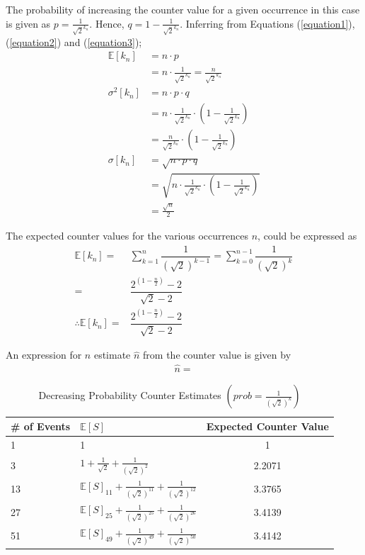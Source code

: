 \documentclass[longpaper, english, final, times]{revdetua}
\begin{document}
		The probability of increasing the counter value for a given occurrence in this case is given as $p=\frac{1}{\sqrt{2}^{k_n}}$. Hence, $q=1-\frac{1}{\sqrt{2}^{k_n}}$.
		Inferring from Equations (\ref{equation1}), (\ref{equation2}) and (\ref{equation3});
		\begin{align*}
			\mathbb{E}[k_n] &= n\cdot p\\
			&=n\cdot \frac{1}{\sqrt{2}^{k_n}}=\frac{n}{\sqrt{2}^{k_n}} \\
			\sigma^2[k_n] &= n\cdot p\cdot q\\
			&=n\cdot \frac{1}{\sqrt{2}^{k_n}} \cdot \left(1-\frac{1}{\sqrt{2}^{k_n}}\right) \\ 
			&=\frac{n}{\sqrt{2}^{k_n}}\cdot \left(1-\frac{1}{\sqrt{2}^{k_n}}\right) \\
			\sigma[k_n] &= \sqrt{n\cdot p\cdot q}\\
			&=\sqrt{n\cdot \frac{1}{\sqrt{2}^{k_n}} \cdot \left(1-\frac{1}{\sqrt{2}^{k_n}}\right) }\\
			&=\frac{\sqrt{n}}{2}
		\end{align*}
	
	
		The expected counter values for the various occurrences $n$, could be expressed as
		\begin{align*}
			\mathbb{E}[k_n]=&\sum_{k=1}^{n}\dfrac{1}{\left(\sqrt{2}\right)^{k-1}}=\sum_{k=0}^{n-1}\dfrac{1}{\left(\sqrt{2}\right)^{k}} \\
			=&\dfrac{2^{(1-\frac{n}{2})}-2}{\sqrt{2}-2} \\
			\therefore \mathbb{E}[k_n]=&\dfrac{2^{(1-\frac{n}{2})}-2}{\sqrt{2}-2} \tag{3} \label{equation:3} 
		\end{align*}
	
		An expression for $n$ estimate $\widehat{n}$ from the counter value is given by
		\begin{align*}
			\widehat{n} = 
		\end{align*}
	
		
		
		\begin{table}[b!]
			\label{table:decreasingProbCounterExpectedEstimate}
			\caption{Decreasing Probability Counter Estimates $\left(prob=\frac{1}{(\sqrt{2})^k}\right)$}
			{\def\arraystretch{2}%
				\begin{tabular}{l|l|c}
					\toprule
					\# of Events & $\mathbb{E}[S]$ & Expected Counter Value\\
					\hline
					1 & 1 & 1 \\
					3 & $1+\frac{1}{\sqrt{2}}+\frac{1}{(\sqrt{2})^2}$&2.2071\\
					13 & $\mathbb{E}[S]_{11}+\frac{1}{(\sqrt{2})^{11}}+\frac{1}{(\sqrt{2})^{12}}$&3.3765 \\
					27 & $\mathbb{E}[S]_{25}+\frac{1}{(\sqrt{2})^{25}}+\frac{1}{(\sqrt{2})^{26}}$&3.4139 \\
					51 & $\mathbb{E}[S]_{49}+\frac{1}{(\sqrt{2})^{49}}+\frac{1}{(\sqrt{2})^{50}}$&3.4142 \\
				\end{tabular}
			}
		\end{table}
			
\end{document}
